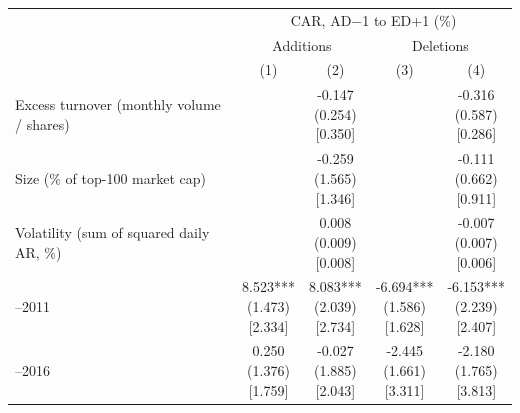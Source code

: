 \begin{threeparttable}
\begingroup
\renewcommand\cellalign{t}
\renewcommand\arraystretch{1}
\setlength{\tabcolsep}{5pt}
\begin{tabular}{@{}lcccc}
\toprule
 & \multicolumn{4}{c}{CAR, AD$-$1 to ED+1 (\%)} \\
\cmidrule(lr){2-5}
 & \multicolumn{2}{c}{Additions} & \multicolumn{2}{c}{Deletions} \\
\cmidrule(lr){2-3} \cmidrule(lr){4-5}
 & (1) & (2) & (3) & (4) \\
\midrule
\addlinespace[1ex]
Excess turnover (monthly volume / shares) &  & \makecell{-0.147 \\ (0.254) \\{}[0.350]} &  & \makecell{-0.316 \\ (0.587) \\{}[0.286]} \\
\addlinespace[0.25ex]
\addlinespace[0.25ex]
Size (\% of top-100 market cap) &  & \makecell{-0.259 \\ (1.565) \\{}[1.346]} &  & \makecell{-0.111 \\ (0.662) \\{}[0.911]} \\
\addlinespace[0.25ex]
\addlinespace[0.25ex]
Volatility (sum of squared daily AR, \%) &  & \makecell{0.008 \\ (0.009) \\{}[0.008]} &  & \makecell{-0.007 \\ (0.007) \\{}[0.006]} \\
\addlinespace[0.25ex]
\addlinespace[0.25ex]
2007–2011 & \makecell{8.523*** \\ (1.473) \\{}[2.334]} & \makecell{8.083*** \\ (2.039) \\{}[2.734]} & \makecell{-6.694*** \\ (1.586) \\{}[1.628]} & \makecell{-6.153*** \\ (2.239) \\{}[2.407]} \\
\addlinespace[0.25ex]
\addlinespace[0.25ex]
2012–2016 & \makecell{0.250 \\ (1.376) \\{}[1.759]} & \makecell{-0.027 \\ (1.885) \\{}[2.043]} & \makecell{-2.445 \\ (1.661) \\{}[3.311]} & \makecell{-2.180 \\ (1.765) \\{}[3.813]} \\

\end{tabular}
\end{threeparttable}
